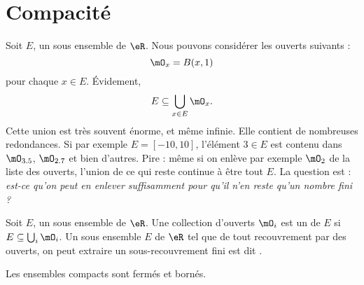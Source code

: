 \section{Compacité}

Soit $E$, un sous ensemble de $\eR$. Nous pouvons considérer les ouverts suivants : 
\begin{equation}
    \mO_x=B(x,1)
\end{equation}
pour chaque $x\in E$. Évidement,
\begin{equation}
    E\subseteq \bigcup_{x\in E}\mO_x.
\end{equation}
Cette union est très souvent énorme, et même infinie. Elle contient de nombreuses redondances. Si par exemple $E=[-10,10]$, l'élément $3\in E$ est contenu dans $\mO_{3.5}$, $\mO_{2.7}$ et bien d'autres. Pire : même si on enlève par exemple $\mO_2$ de la liste des ouverts, l'union de ce qui reste continue à être tout $E$. La question est : \emph{est-ce qu'on peut en enlever suffisamment pour qu'il n'en reste qu'un nombre fini ?}
\begin{definition}
Soit $E$, un sous ensemble de $\eR$. Une collection d'ouverts $\mO_i$ est un  de $E$ si $E\subseteq \bigcup_{i}\mO_i$. Un sous ensemble $E$ de $\eR$ tel que de tout recouvrement par des ouverts, on peut extraire un sous-recouvrement fini est dit .
\end{definition}

\begin{proposition}
Les ensembles compacts sont fermés et bornés.
\end{proposition}

